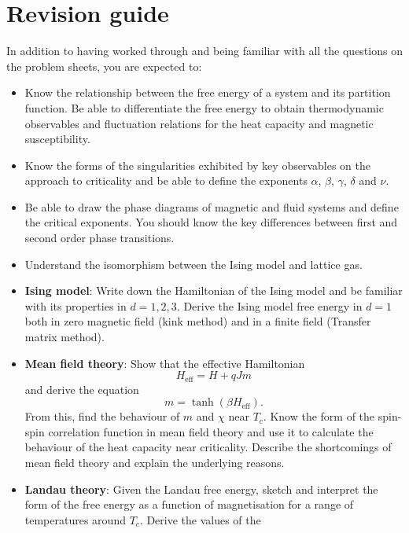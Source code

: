 \documentclass[
  letterpaper,
  enabledeprecatedfontcommands]{report}
\begin{document}

\cleardoublepage
{}
{}
\appendix

\chapter{Revision guide}\label{revision-guide}

In addition to having worked through and being familiar with all the
questions on the problem sheets, you are expected to:

\begin{itemize}
\item
  Know the relationship between the free energy of a system and its
  partition function. Be able to differentiate the free energy to obtain
  thermodynamic observables and fluctuation relations for the heat
  capacity and magnetic susceptibility.
\item
  Know the forms of the singularities exhibited by key observables on
  the approach to criticality and be able to define the exponents
  \(\alpha\), \(\beta\), \(\gamma\), \(\delta\) and \(\nu\).
\item
  Be able to draw the phase diagrams of magnetic and fluid systems and
  define the critical exponents. You should know the key differences
  between first and second order phase transitions.
\item
  Understand the isomorphism between the Ising model and lattice gas.
\item
  \textbf{Ising model}: Write down the Hamiltonian of the Ising model
  and be familiar with its properties in \(d = 1, 2, 3\). Derive the
  Ising model free energy in \(d = 1\) both in zero magnetic field (kink
  method) and in a finite field (Transfer matrix method).
\item
  \textbf{Mean field theory}: Show that the effective Hamiltonian
  \[ H_{\text{eff}} = H + qJm \] and derive the equation
  \[ m = \tanh(\beta H_{\text{eff}}). \] From this, find the behaviour
  of \(m\) and \(\chi\) near \(T_c\). Know the form of the spin-spin
  correlation function in mean field theory and use it to calculate the
  behaviour of the heat capacity near criticality. Describe the
  shortcomings of mean field theory and explain the underlying reasons.
\item
  \textbf{Landau theory}: Given the Landau free energy, sketch and
  interpret the form of the free energy as a function of magnetisation
  for a range of temperatures around \(T_c\). Derive the values of the

\end{itemize}
\end{document}
